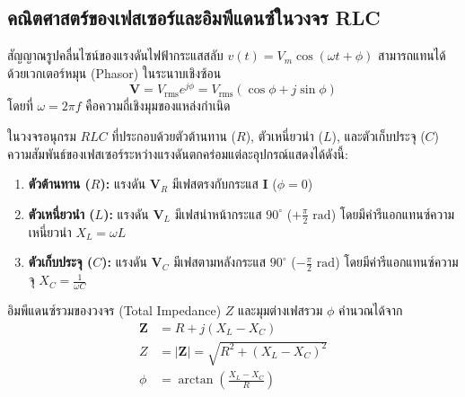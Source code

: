 \subsection{คณิตศาสตร์ของเฟสเซอร์และอิมพีแดนซ์ในวงจร RLC}

สัญญาณรูปคลื่นไซน์ของแรงดันไฟฟ้ากระแสสลับ $v(t) = V_m \cos(\omega t + \phi)$ สามารถแทนได้ด้วยเวกเตอร์หมุน (Phasor) ในระนาบเชิงซ้อน
\begin{equation}
\mathbf{V} = V_{\text{rms}} e^{j\phi} = V_{\text{rms}} (\cos\phi + j\sin\phi) \label{eq:phasor_def}
\end{equation}
โดยที่ $\omega = 2\pi f$ คือความถี่เชิงมุมของแหล่งกำเนิด

ในวงจรอนุกรม $RLC$ ที่ประกอบด้วยตัวต้านทาน ($R$), ตัวเหนี่ยวนำ ($L$), และตัวเก็บประจุ ($C$) ความสัมพันธ์ของเฟสเซอร์ระหว่างแรงดันตกคร่อมแต่ละอุปกรณ์แสดงได้ดังนี้:
\begin{enumerate}
    \item \textbf{ตัวต้านทาน ($R$):} แรงดัน $\mathbf{V}_R$ มีเฟสตรงกับกระแส $\mathbf{I}$ ($\phi = 0$)
    \item \textbf{ตัวเหนี่ยวนำ ($L$):} แรงดัน $\mathbf{V}_L$ มีเฟสนำหน้ากระแส $90^\circ$ ($+\frac{\pi}{2}\text{ rad}$) โดยมีค่ารีแอกแทนซ์ความเหนี่ยวนำ $X_L = \omega L$
    \item \textbf{ตัวเก็บประจุ ($C$):} แรงดัน $\mathbf{V}_C$ มีเฟสตามหลังกระแส $90^\circ$ ($-\frac{\pi}{2}\text{ rad}$) โดยมีค่ารีแอกแทนซ์ความจุ $X_C = \frac{1}{\omega C}$
\end{enumerate}

อิมพีแดนซ์รวมของวงจร (Total Impedance) $Z$ และมุมต่างเฟสรวม $\phi$ คำนวณได้จาก
\begin{align}
\mathbf{Z} &= R + j(X_L - X_C) \label{eq:impedance_complex} \\
Z &= |\mathbf{Z}| = \sqrt{R^2 + (X_L - X_C)^2} \label{eq:impedance_mag} \\
\phi &= \arctan\left(\frac{X_L - X_C}{R}\right) \label{eq:phase_angle}
\end{align}

